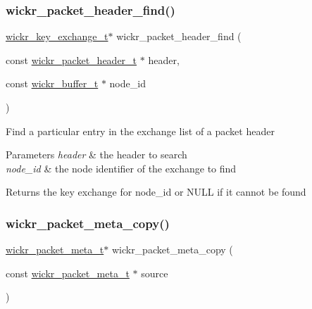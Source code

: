 \subsubsection{\texorpdfstring{wickr\+\_\+packet\+\_\+header\+\_\+find()}{wickr\_packet\_header\_find()}}
{\footnotesize\ttfamily \hyperlink{structwickr__key__exchange}{wickr\+\_\+key\+\_\+exchange\+\_\+t}$\ast$ wickr\+\_\+packet\+\_\+header\+\_\+find (\begin{DoxyParamCaption}\item[{const \hyperlink{structwickr__packet__header}{wickr\+\_\+packet\+\_\+header\+\_\+t} $\ast$}]{header,  }\item[{const \hyperlink{structwickr__buffer}{wickr\+\_\+buffer\+\_\+t} $\ast$}]{node\+\_\+id }\end{DoxyParamCaption})}

Find a particular entry in the exchange list of a packet header


\begin{DoxyParams}{Parameters}
{\em header} & the header to search \\
\hline
{\em node\+\_\+id} & the node identifier of the exchange to find \\
\hline
\end{DoxyParams}
\begin{DoxyReturn}{Returns}
the key exchange for \textquotesingle{}node\+\_\+id\textquotesingle{} or N\+U\+LL if it cannot be found 
\end{DoxyReturn}
\mbox{\label{group__wickr__protocol_ga1bb5a0f2a49069679b174b3e6521fe9b}} 
\subsubsection{\texorpdfstring{wickr\+\_\+packet\+\_\+meta\+\_\+copy()}{wickr\_packet\_meta\_copy()}}
{\footnotesize\ttfamily \hyperlink{structwickr__packet__meta}{wickr\+\_\+packet\+\_\+meta\+\_\+t}$\ast$ wickr\+\_\+packet\+\_\+meta\+\_\+copy (\begin{DoxyParamCaption}\item[{const \hyperlink{structwickr__packet__meta}{wickr\+\_\+packet\+\_\+meta\+\_\+t} $\ast$}]{source }\end{DoxyParamCaption})}

